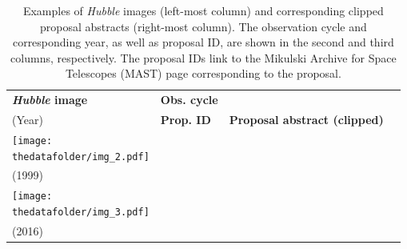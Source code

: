 \documentclass{article} %
\newcommand{\hubble}{\emph{Hubble}\xspace}
\begin{document}
   \begin{table}[h!]
     \centering
     \begin{tabular}{m{} p{1.9cm} p{1.9cm} m{5.5cm}}
         \toprule
         \centering \bfseries \hubble image & \centering \bfseries Obs. cycle \\ (Year) & \centering \bfseries Prop. ID & \centering \bfseries Proposal abstract (clipped) \tabularnewline
         \midrule
         \centering \texttt{[image: \\thedatafolder/img\_2.pdf]} & \centering  \\ (1999) & \centering  &  {\scriptsize } \tabularnewline
         \midrule
         \centering \texttt{[image: \\thedatafolder/img\_3.pdf]} & \centering  \\ (2016) & \centering  &  {\scriptsize } \tabularnewline
         \bottomrule
     \end{tabular}
     \caption{Examples of \hubble images (left-most column) and corresponding clipped proposal abstracts (right-most column). The observation cycle and corresponding year, as well as proposal ID, are shown in the second and third columns, respectively. The proposal IDs link to the Mikulski Archive for Space Telescopes (MAST) page corresponding to the proposal.}
     \label{tab:dataset}
   \end{table}
   
\end{document}
